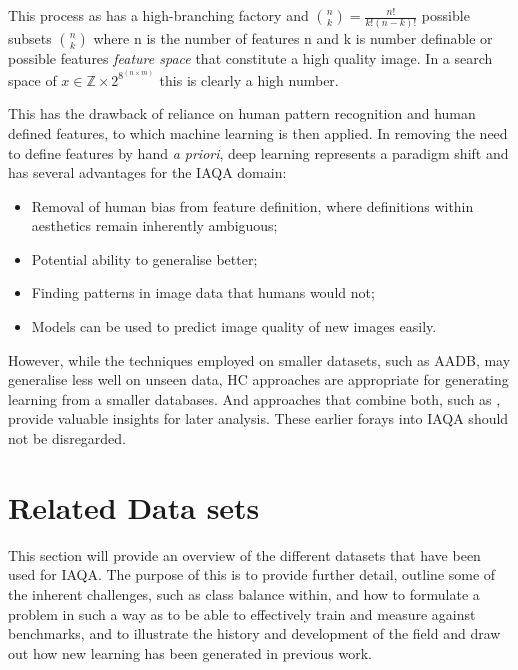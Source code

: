 This process as has a high-branching factory and  ${\binom{n}{k} = \frac{n!}{k!(n-k)!}}$  possible subsets ${\binom{n}{k}}$ where n is the number of features n and k is number definable or possible features \textit{feature space} that constitute a high quality image. In a search space of $x \in \mathbb{Z} \times 2^{8^{(n \times m)}}$ this is clearly a high number. 

This has the drawback of reliance on human pattern recognition and human defined features, to which machine learning is then applied. In removing the need to define features by hand \textit{a priori}, deep learning represents a paradigm shift and has several advantages for the IAQA domain: 


\par
   
\begin{itemize}

    \item Removal of human bias from feature definition, where definitions within aesthetics remain inherently ambiguous;
    \item Potential ability to generalise better;
    \item Finding patterns in image data that humans would not;
    \item Models can be used to predict image quality of new images easily. 
\end{itemize}

However, while the techniques employed on smaller datasets, such as AADB, may generalise less well on unseen data, HC approaches are appropriate for generating learning from a smaller databases. And approaches that combine both, such as \cite{Kong2016}, provide valuable insights for later analysis. These earlier forays into IAQA should not be disregarded. 
\newpage



\section{Related Data sets}
\label{sec:related_data} 

This section will provide an overview of the different datasets that have been used for IAQA. The purpose of this is to provide further detail, outline some of the inherent challenges, such as class balance within, and how to formulate a problem in such a way as to be able to effectively train and measure against benchmarks, and to illustrate the history and development of the field and draw out how new learning has been generated in previous work.\par

